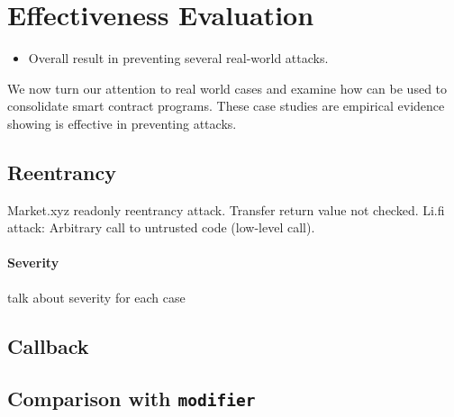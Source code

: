 \section{Effectiveness Evaluation} \label{sec:case}
\begin{itemize}
	\item Overall result in preventing several real-world attacks.
\end{itemize}

We now turn our attention to real world cases and examine how \lang
can be used to consolidate smart contract programs.
These case studies are empirical evidence showing \lang is effective
in preventing attacks.

\subsection{Reentrancy}
Market.xyz readonly reentrancy attack.
Transfer return value not checked.
Li.fi attack: Arbitrary call to untrusted code (low-level call).

\paragraph{Severity} talk about severity for each case

\subsection{Callback}

\subsection{Comparison with \texttt{modifier}}




